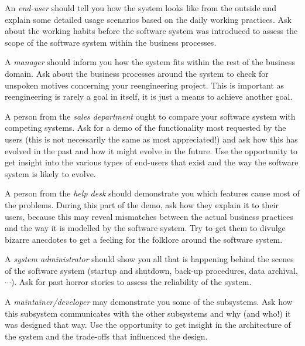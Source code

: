 \documentclass[a4paper,10pt,twoside]{book}
\begin{document}
\begin{bulletlist}
  \item An \emph{end-user} should tell you how the system looks like from the outside and explain some detailed usage scenarios based on the daily working practices. Ask about the working habits before the software system was introduced to assess the scope of the software system within the business processes.

  \item A \emph{manager} should inform you how the system fits within the rest of the business domain. Ask about the business processes around the system to check for unspoken motives concerning your reengineering project. This is important as reengineering is rarely a goal in itself, it is just a means to achieve another goal.

  \item A person from the \emph{sales department} ought to compare your software system with competing systems. Ask for a demo of the functionality most requested by the users (this is not necessarily the same as most appreciated!) and ask how this has evolved in the past and how it might evolve in the future. Use the opportunity to get insight into the various types of end-users that exist and the way the software system is likely to evolve.

  \item A person from the \emph{help desk} should demonstrate you which features cause most of the problems. During this part of the demo, ask how they explain it to their users, because this may reveal mismatches between the actual business practices and the way it is modelled by the software system. Try to get them to divulge bizarre anecdotes to get a feeling for the folklore around the software system.

  \item A \emph{system administrator} should show you all that is happening behind the scenes of the software system (\ie startup and shutdown, back-up procedures, data archival, $\cdots$). Ask for past horror stories to assess the reliability of the system.

  \item A \emph{maintainer/developer} may demonstrate you some of the subsystems. Ask how this subsystem communicates with the other subsystems and why (and who!) it was designed that way. Use the opportunity to get insight in the architecture of the system and the trade-offs that influenced the design.
\end{bulletlist}
\end{document}
